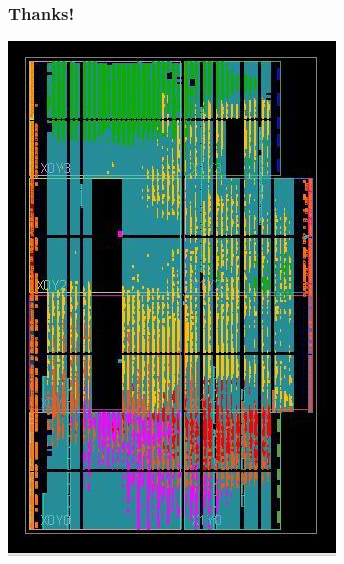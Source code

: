 \documentclass[UTF-8]{ctexbeamer}
\begin{document}
\begin{frame}
  \frametitle{Thanks!}

  \begin{center}
    \includegraphics[height=0.7\textheight]{assets/board.jpg}
  \end{center}
\end{frame}
\end{document}
